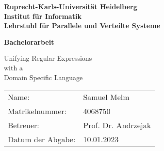 \begin{titlepage}


\vspace*{1cm}
\begin{center}
\vspace*{3cm}
\textbf{ 
\Large Ruprecht-Karls-Universität Heidelberg\\
\smallskip
\Large Institut für Informatik\\
\smallskip
\Large Lehrstuhl für Parallele und Verteilte Systeme\\
\smallskip
}

\vspace{3cm}

\textbf{\large Bachelorarbeit}

\vspace{0.5\baselineskip}
{\huge
    Unifying Regular Expressions \\\vspace{2mm} with a \\\vspace{5mm} Domain Specific Language
}
\end{center}

\vfill 

{\large
\begin{tabular}[l]{ll}
Name: & Samuel Melm\\
Matrikelnummer: & 4068750 \\
Betreuer: & Prof. Dr. Andrzejak\\
Datum der Abgabe: & 10.01.2023
\end{tabular}
}

\end{titlepage}
